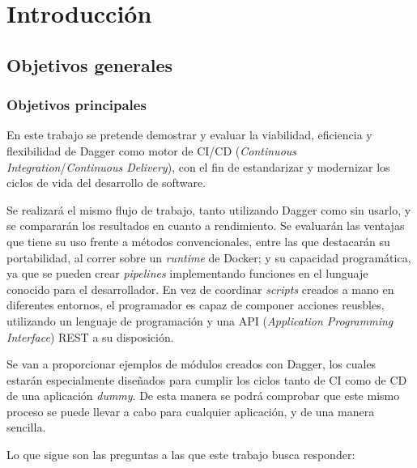 \chapter{Introducción}


\section{Objetivos generales}


\subsection*{Objetivos principales}

En este trabajo se pretende demostrar y evaluar la viabilidad, eficiencia y flexibilidad de Dagger\cite{dagger} como motor de CI/CD (\textit{Continuous Integration}/\textit{Continuous Delivery})\cite{ci,cd}, con el fin de estandarizar y modernizar los ciclos de vida del desarrollo de software.

Se realizará el mismo flujo de trabajo, tanto utilizando Dagger como sin usarlo, y se compararán los resultados en cuanto a rendimiento. Se evaluarán las ventajas que tiene su uso frente a métodos convencionales, entre las que destacarán su portabilidad, al correr sobre un \textit{runtime} de Docker; y su capacidad programática, ya que se pueden crear \textit{pipelines} implementando funciones en el lunguaje conocido para el desarrollador. En vez de coordinar \textit{scripts} creados a mano en diferentes entornos, el programador es capaz de componer acciones reusbles, utilizando un lenguaje de programación y una API (\textit{Application Programming Interface}) REST a su disposición.

Se van a proporcionar ejemplos de módulos creados con Dagger, los cuales estarán especialmente diseñados para cumplir los ciclos tanto de CI como de CD de una aplicación \textit{dummy}. De esta manera se podrá comprobar que este mismo proceso se puede llevar a cabo para cualquier aplicación, y de una manera sencilla.

Lo que sigue son las preguntas a las que este trabajo busca responder:

